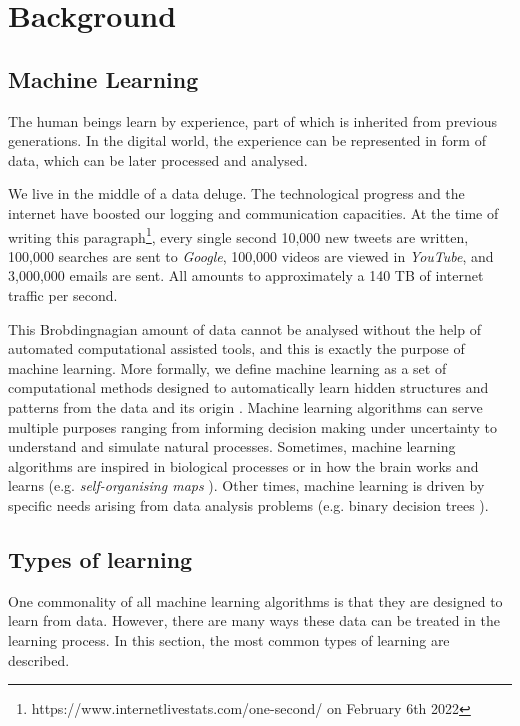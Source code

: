 \chapter{Background} \label{ch:background}
\section{Machine Learning}
The human beings learn by experience, part of which is inherited from previous generations. In the digital world, the experience can be represented in form of data, which can be later processed and analysed.

We live in the middle of a data deluge. The technological progress and the internet have boosted our logging and communication capacities. At the time of writing this paragraph\footnote{https://www.internetlivestats.com/one-second/ on February 6th 2022}, every single second 10,000 new tweets are written, 100,000 searches are sent to \textit{Google}, 100,000 videos are viewed in \textit{YouTube}, and 3,000,000 emails are sent. All amounts to approximately a 140 TB of internet traffic per second.

This Brobdingnagian amount of data cannot be analysed without the help of automated computational assisted tools, and this is exactly the purpose of machine learning. More formally, we define machine learning as a set of computational methods designed to automatically learn hidden structures and patterns from the data and its origin \autocite{murphy2012, theodoridis2015}. Machine learning algorithms can serve multiple purposes ranging from informing decision making under uncertainty to understand and simulate natural processes. Sometimes, machine learning algorithms are inspired in biological processes or in how the brain works and learns \autocite{haykin1998} (e.g. \textit{self-organising maps} \autocite{kohonen2001}). Other times, machine learning is driven by specific needs arising from data analysis problems (e.g. binary decision trees \autocite{hastie2009, hastie2014}).

\section{Types of learning}
One commonality of all machine learning algorithms is that they are designed to learn from data. However, there are many ways these data can be treated in the learning process. In this section, the most common types of learning are described.

